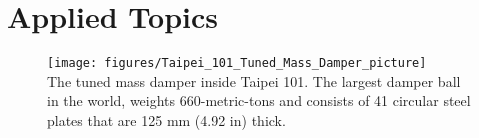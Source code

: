 \documentclass[12pt,letter]{article}
\begin{document}
\pagebreak

\graphicspath{{Chapter_1_fundamentals_of_vibrations/}} 










\part{Applied Topics}

\begin{figure}[H]
	\centering
	\texttt{[image: figures/Taipei\_101\_Tuned\_Mass\_Damper\_picture]} \\
	The tuned mass damper inside Taipei 101.  The largest damper ball in the world, weights 660-metric-tons and consists of 41 circular steel plates that are 125 mm (4.92 in) thick.  \protect\footnotemark[1]
\end{figure}








%
\end{document}

